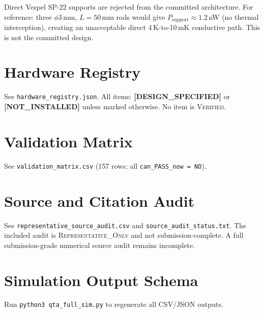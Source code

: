 \documentclass[12pt,a4paper]{article}
\newcommand{\designspec}{\textbf{[DESIGN\_SPECIFIED]}}
\newcommand{\notinstalled}{\textbf{[NOT\_INSTALLED]}}
\begin{document}
Direct Vespel SP-22 supports are rejected from the committed architecture.
For reference: three $\phi3$\,mm, $L=50$\,mm rods would give
$P_\mathrm{support} \approx 1.2$\,nW (no thermal interception),
creating an unacceptable direct 4\,K-to-10\,mK conductive path.
This is not the committed design.

\section{Hardware Registry}
\label{app:hardware}
See \texttt{hardware\_registry.json}.
All items: \designspec{} or \notinstalled{} unless marked otherwise.
No item is \textsc{Verified}.

\section{Validation Matrix}
\label{app:valmat}
See \texttt{validation\_matrix.csv} (157 rows; all \texttt{can\_PASS\_now = NO}).

\section{Source and Citation Audit}
\label{app:sources}
See \texttt{representative\_source\_audit.csv} and \texttt{source\_audit\_status.txt}. The included audit is \textsc{Representative\_Only} and not submission-complete. A full submission-grade numerical source audit remains incomplete.

\section{Simulation Output Schema}
\label{app:sim}
Run \verb|python3 qta_full_sim.py| to regenerate all CSV/JSON outputs.

\end{document}
